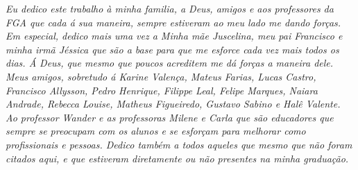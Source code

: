 \begin{dedicatoria}
   \vspace*{\fill}
   \textit{Eu dedico este trabalho à minha familia, a Deus, amigos e aos professores da FGA que cada á sua maneira, sempre estiveram ao meu lado me dando forças. Em especial, dedico mais uma vez a Minha mãe Juscelina, meu pai Francisco e minha irmã Jéssica que são a base para que me esforce cada vez mais todos os dias. Á Deus, que mesmo que poucos acreditem me dá forças a maneira dele. Meus amigos, sobretudo á Karine Valença, Mateus Farias, Lucas Castro, Francisco Allysson, Pedro Henrique, Filippe Leal, Felipe Marques, Naiara Andrade, Rebecca Louise, Matheus Figueiredo, Gustavo Sabino e Halê Valente. Ao professor Wander e as professoras Milene e Carla que são educadores que sempre se preocupam com os alunos e se esforçam para melhorar como profissionais e pessoas. Dedico também a todos aqueles que mesmo que não foram citados aqui, e que estiveram diretamente ou não presentes na minha graduação. }
   \vspace*{\fill}
\end{dedicatoria}

